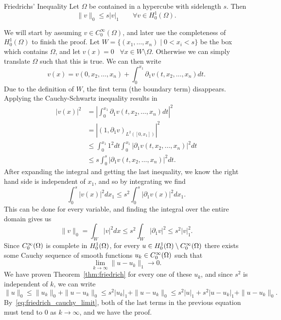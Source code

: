 \begin{thmx}{Friedrichs' Inequality}
Let $\Omega$ be contained in a hypercube with sidelength $s$. Then 
\begin{equation*}
    \| v \|_0 \leq s |v|_1 \quad \quad \forall v \in H_0^1(\Omega).
\end{equation*}\label{thm:friedrich}
\vspace{-8mm}
\end{thmx}
\begin{bev}
We will start by assuming $v \in C_0^{\infty}(\Omega)$, and later use the 
completeness of $H_0^1(\Omega)$ to finish the proof.
Let $W = \{ (x_1, \ldots, x_n) \mid 0 < x_i < s \}$ be the box 
which contains $\Omega$, and let $v(x)=0$ \, $\forall x
\in W\setminus \Omega$. Otherwise we can simply translate $\Omega$ such that 
this is true.
 We can then write 
\begin{equation*}
v(x)=v(0, x_2, \ldots, x_n) + \int_{0}^{x_1} \partial _1 v(t,x_2, \ldots, x_n) dt.
\end{equation*}
Due to the definition of $W$, the first term (the boundary term) 
disappears. Applying the Cauchy-Schwartz inequality results in 
\begin{align*}
    |v(x)|^2 &= \left|\int_{0}^{x_1} \partial _1 v(t,x_2, \ldots, x_n) dt \right|^2 \\ 
    &= |{(1, \partial _1 v)}_{L^2([0,x_1])}|^2 \\
    & \leq \int_{0}^{x_1} 1^2 dt \int_{0}^{x_1}|\partial_1 v(t, x_2, \ldots, x_n)|^2 dt \\ 
    &\leq s \int_{0}^{s}|\partial_1 v(t, x_2, \ldots, x_n)|^2 dt. 
\end{align*}
After expanding the integral and getting the last inequality, we know 
the right hand side is independent of $x_1$, and so by integrating we find 
\begin{equation*}
    \int_{0}^{s}|v(x)|^2dx_1 \leq s^2\int_{0}^{s}|\partial _1 v(x)|^2dx_1.
\end{equation*}
This can be done for every variable, and finding the integral over the entire 
domain gives us 
\begin{equation*}
    \|v\|_0 = \int_{W}|v|^2 dx \leq s^2 \int_{W} |\partial _1v|^2 \leq s^2 |v|_1^2.
\end{equation*}
Since $C^\infty_0(\Omega)$ is complete in $H_0^1(\Omega)$, for every $u \in H_0^1(\Omega)\setminus C^\infty_0(\Omega)$
there exists some Cauchy sequence of smooth functions $u_k \in C^\infty_0(\Omega)$
 such that 
\begin{equation}
    \lim_{k \to \infty} \| u-u_k\|_1 \to 0.
    \label{eq:friedrich_cauchy_limit}
\end{equation}
We have proven Theorem~\ref{thm:friedrich} for every one of these $u_k$, and 
since $s^2$ is independent of $k$, we can write 
\begin{equation*}
    \|u\|_0 \leq \|u_k\|_0 + \|u-u_k\|_0 \leq  s^2|u_k|_1 +  \|u-u_k\|_0 \leq s^2|u|_1 + s^2|u-u_k|_1 + \|u-u_k\|_0.
\end{equation*}
By~\eqref{eq:friedrich_cauchy_limit}, both of the last terms in the 
previous equation must tend to $0$ as $k \to \infty$, and we have the proof.
\end{bev}

